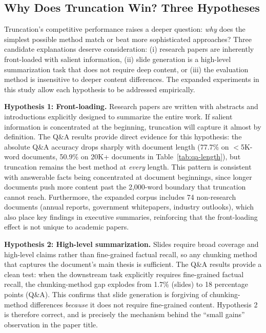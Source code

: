 \documentclass{ieeeaccess}
\begin{document}
\subsection{Why Does Truncation Win? Three Hypotheses}
\label{sec:why-truncation}

Truncation's competitive performance raises a deeper question: \emph{why} does the simplest possible method match or beat more sophisticated approaches? Three candidate explanations deserve consideration: (i) research papers are inherently front-loaded with salient information, (ii) slide generation is a high-level summarization task that does not require deep content, or (iii) the evaluation method is insensitive to deeper content differences. The expanded experiments in this study allow each hypothesis to be addressed empirically.

\textbf{Hypothesis 1: Front-loading.} Research papers are written with abstracts and introductions explicitly designed to summarize the entire work. If salient information is concentrated at the beginning, truncation will capture it almost by definition. The Q\&A results provide direct evidence for this hypothesis: the absolute Q\&A accuracy drops sharply with document length (77.7\% on $<$5K-word documents, 50.9\% on 20K+ documents in Table~\ref{tab:qa-length}), but truncation remains the best method at \emph{every} length. This pattern is consistent with answerable facts being concentrated at document beginnings, since longer documents push more content past the 2,000-word boundary that truncation cannot reach. Furthermore, the expanded corpus includes 74 non-research documents (annual reports, government whitepapers, industry outlooks), which also place key findings in executive summaries, reinforcing that the front-loading effect is not unique to academic papers.

\textbf{Hypothesis 2: High-level summarization.} Slides require broad coverage and high-level claims rather than fine-grained factual recall, so any chunking method that captures the document's main thesis is sufficient. The Q\&A results provide a clean test: when the downstream task explicitly requires fine-grained factual recall, the chunking-method gap explodes from 1.7\% (slides) to 18 percentage points (Q\&A). This confirms that slide generation is forgiving of chunking-method differences \emph{because} it does not require fine-grained content. Hypothesis 2 is therefore correct, and is precisely the mechanism behind the ``small gains'' observation in the paper title.
\end{document}
